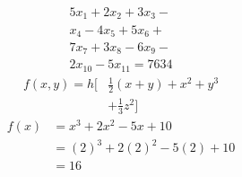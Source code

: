 \documentclass[a4paper]{article}
\begin{document}
    \begin{multline}
    5x_1 + 2x_2 + 3x_3 -\\
    x_4 - 4x_5 + 5x_6 +\\
    7x_7 + 3x_8 - 6x_9 -\\
    2x_{10} - 5x_{11} = 7634
    \end{multline}
    \vfil
    \begin{equation}
        \begin{split}
        f(x,y)=h \biggl[ & \frac{1}{2}(x+y)+x^2+y^3\\
        & +\frac{1}{3}z^2\biggr]
        \end{split}
    \end{equation}
    \vfil
    \begin{equation*}
        \begin{split}
        f(x) &= x^3 + 2x^2 - 5x + 10\\
             &= (2)^3 + 2(2)^2 - 5(2) + 10\\
             &= 16
        \end{split}
    \end{equation*}
\end{document}
